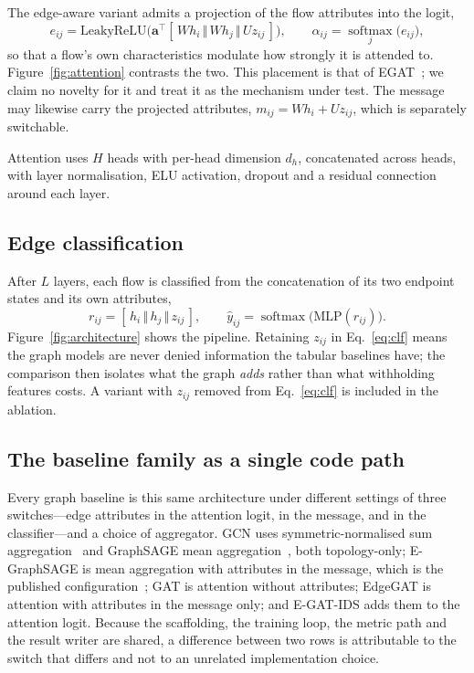 The edge-aware variant admits a projection of the flow attributes into the
logit,
\begin{equation}
e_{ij} = \mathrm{LeakyReLU}\big(\mathbf{a}^{\top}
  [\,W h_i \,\Vert\, W h_j \,\Vert\, U z_{ij}\,]\big),
\qquad
\alpha_{ij} = \operatorname*{softmax}_{j}\big(e_{ij}\big),
\label{eq:egat}
\end{equation}
so that a flow's own characteristics modulate how strongly it is attended to.
Figure~\ref{fig:attention} contrasts the two. This placement is that of
EGAT~\cite{chen2021egat}; we claim no novelty for it and treat it as the
mechanism under test. The message may likewise carry the projected attributes,
$m_{ij} = W h_i + U z_{ij}$, which is separately switchable.

Attention uses $H$ heads with per-head dimension $d_h$, concatenated across
heads, with layer normalisation, ELU activation, dropout and a residual
connection around each layer.

\subsection{Edge classification}

After $L$ layers, each flow is classified from the concatenation of its two
endpoint states and its own attributes,
\begin{equation}
r_{ij} = [\, h_i \,\Vert\, h_j \,\Vert\, z_{ij} \,], \qquad
\hat{y}_{ij} = \operatorname{softmax}\big(\mathrm{MLP}(r_{ij})\big).
\label{eq:clf}
\end{equation}
Figure~\ref{fig:architecture} shows the pipeline. Retaining $z_{ij}$ in
Eq.~\eqref{eq:clf} means the graph models are never denied information the
tabular baselines have; the comparison then isolates what the graph
\emph{adds} rather than what withholding features costs. A variant with
$z_{ij}$ removed from Eq.~\eqref{eq:clf} is included in the ablation.

\subsection{The baseline family as a single code path}

Every graph baseline is this same architecture under different settings of
three switches---edge attributes in the attention logit, in the message, and in
the classifier---and a choice of aggregator. GCN uses symmetric-normalised
sum aggregation~\cite{kipf2017gcn} and GraphSAGE mean
aggregation~\cite{hamilton2017graphsage}, both topology-only; E-GraphSAGE is
mean aggregation with attributes in the message, which is the published
configuration~\cite{lo2022egraphsage}; GAT is attention without attributes;
EdgeGAT is attention with attributes in the message only; and E-GAT-IDS adds
them to the attention logit. Because the scaffolding, the training loop, the
metric path and the result writer are shared, a difference between two rows is
attributable to the switch that differs and not to an unrelated
implementation choice.

